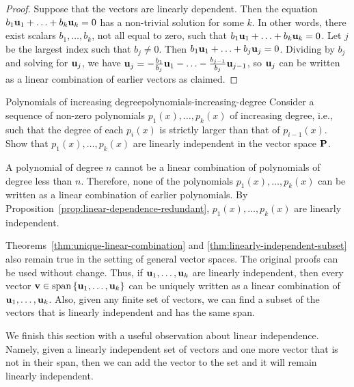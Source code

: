 \begin{proof}
  Suppose that the vectors are linearly dependent. Then the equation
  $b_1\mbox{\bf u}_1+\ldots+b_k\mbox{\bf u}_k=0$ has a non-trivial solution
  for some $k$. In other words, there exist scalars $b_1,\ldots,b_k$,
  not all equal to zero, such that
  $b_1\mbox{\bf u}_1+\ldots+b_k\mbox{\bf u}_k=0$. Let $j$ be the largest index
  such that $b_j\neq 0$. Then
  $b_1\mbox{\bf u}_1+\ldots+b_j\mbox{\bf u}_j=0$. Dividing by $b_j$ and
  solving for $\mbox{\bf u}_j$, we have
  $\mbox{\bf u}_j = -\frac{b_1}{b_j}\mbox{\bf u}_1 - \ldots -
  \frac{b_{j-1}}{b_j}\mbox{\bf u}_{j-1}$, so $\mbox{\bf u}_j$ can be written
  as a linear combination of earlier vectors as claimed.
\end{proof}

\begin{example}{Polynomials of increasing degree}{polynomials-increasing-degree}
  Consider a sequence of non-zero polynomials $p_1(x), \ldots, p_k(x)$
  of increasing degree, i.e., such that the degree of each $p_i(x)$ is
  strictly larger than that of $p_{i-1}(x)$. Show that
  $p_1(x),\ldots,p_k(x)$ are linearly independent in the vector space
  $\mathbf{P}$.
\end{example}

\begin{solution}
  A polynomial of degree $n$ cannot be a linear combination of
  polynomials of degree less than $n$. Therefore, none of the
  polynomials $p_1(x), \ldots, p_k(x)$ can be written as a linear
  combination of earlier polynomials. By
  Proposition~\ref{prop:linear-dependence-redundant}, $p_1(x), \ldots,
  p_k(x)$ are linearly independent.
\end{solution}

Theorems~\ref{thm:unique-linear-combination} and
{\ref{thm:linearly-independent-subset}} also remain true in the
setting of general vector spaces. The original proofs can be used
without change. Thus, if $\mbox{\bf u}_1,\ldots,\mbox{\bf u}_k$ are linearly
independent, then every vector
$\vect{v}\in\sspan\set{\vect{u}_1,\ldots,\vect{u}_k}$ can be uniquely
written as a linear combination of
$\mbox{\bf u}_1,\ldots,\mbox{\bf u}_k$. Also, given any finite set of vectors,
we can find a subset of the vectors that is linearly independent and
has the same span.

We finish this section with a useful observation about linear
independence. Namely, given a linearly independent set of vectors and
one more vector that is not in their span, then we can add the vector
to the set and it will remain linearly independent. 

